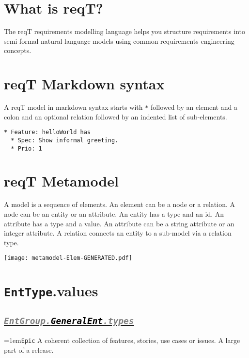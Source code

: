 \documentclass[a4paper,oneside]{article}
\newcommand\Concept[2]{\hangindent=1em\lstinline+#1+ #2}
\begin{document}
\fontsize{9.1}{11}\selectfont

\begin{multicols*}{4}
\raggedright

\section*{What is reqT?}
The reqT requirements modelling language 
helps you structure requirements into semi-formal 
natural-language models using 
common requirements engineering concepts.


\section*{reqT Markdown syntax}
A reqT model in markdown syntax starts with \lstinline+*+ followed by an element and a colon and an optional relation followed by an indented list of sub-elements.

\begin{lstlisting}
* Feature: helloWorld has
  * Spec: Show informal greeting.
  * Prio: 1

\end{lstlisting}

\section*{reqT Metamodel}

A model is a sequence of elements. 
An element can be a node or a relation. 
A node can be an entity or an attribute. 
An entity has a type and an id. 
An attribute has a type and a value. 
An attribute can be a string attribute or an integer attribute. 
A relation connects an entity to a sub-model via a relation type.


\noindent\hspace*{-2.1em}\texttt{[image: metamodel-Elem-GENERATED.pdf]}

\section*{\texttt{EntType}.values}
\subsection*{\underline{\texttt{\textit{{\textcolor{gray}{EntGroup.}\textcolor{black}{GeneralEnt}}\textcolor{gray}{.types}}}}}
\Concept{Epic}{A coherent collection of features, stories, use cases or issues. A large part of a release.}


\end{multicols*}
\end{document}
